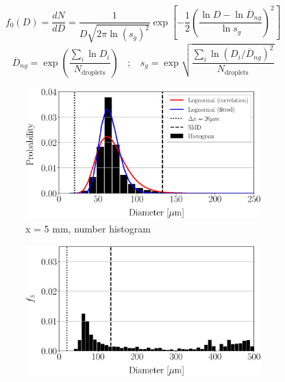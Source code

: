 \begin{equation}
 f_0 \left( D \right) = \frac{d N}{d D} =  \frac{1}{D  \sqrt{2 \pi \ln \left( s_g \right)^2}} \exp \left[ - \frac{1}{2 } \left( \frac{\ln D - \ln \overline{D}_{ng}}{\ln s_g}   \right)^2 \right]
\end{equation}
%
\begin{equation}
\overline{D}_{ng} = \exp \left(  \frac{\sum_i \ln D_i }{N_\mathrm{droplets}} \right)  ~~~~ ; ~~~~ 
s_g = \exp \sqrt{  \frac{\sum_i \ln \left( D_i / \overline{D}_{ng} \right) ^2 }{N_\mathrm{droplets}} }
\end{equation}




\begin{figure}[ht]
\centering
\begin{subfigure}[b]{0.45\textwidth}
	\centering
   \includegraphics[scale=0.30]{./part2_developments/figures_ch5_resolved_JICF/spray_distributions/uG100_dx20_x05_number_histogram.eps}
   \caption{x = 5 mm, number histogram}
\end{subfigure}
\hfill
\begin{subfigure}[b]{0.45\textwidth}
	\centering
   \includegraphics[scale=0.30]{./part2_developments/figures_ch5_resolved_JICF/spray_distributions/uG100_dx20_x05_volume_histogram.eps}

\end{subfigure}
\end{figure}
